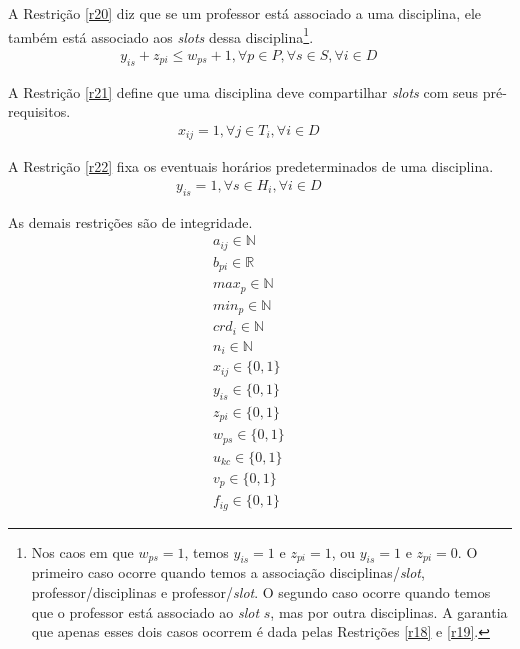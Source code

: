 A Restrição \ref{r20} diz que se um professor está associado a uma disciplina, ele também está associado aos \textit{slots} dessa disciplina\footnote{Nos caos em que $w_{ps} = 1$, temos $y_{is} = 1$ e $z_{pi} = 1$, ou $y_{is} = 1$ e $z_{pi} = 0$. O primeiro caso ocorre quando temos a associação disciplinas/\textit{slot}, professor/disciplinas e professor/\textit{slot}. O segundo caso ocorre quando temos que o professor está associado ao \textit{slot} $s$, mas por outra disciplinas.
A garantia que apenas esses dois casos ocorrem é dada pelas Restrições \ref{r18} e \ref{r19}.}. 
\begin{eqnarray}
\label{r20}
y_{is} + z_{pi} \le w_{ps} + 1, \forall{p}\in{P}, \forall{s}\in{S}, \forall{i}\in{D} &&
\end{eqnarray}

A Restrição \ref{r21} define que uma disciplina deve compartilhar \textit{slots} com seus pré-requisitos.
\begin{eqnarray}
\label{r21}
x_{ij} = 1, \forall{j\in{T_i}},\forall{i \in{D}} &&
\end{eqnarray}

A Restrição \ref{r22} fixa os eventuais horários predeterminados de uma disciplina.
\begin{eqnarray}
\label{r22}
y_{is} = 1, \forall{s \in{H_i}}, \forall{i \in{D}} &&
\end{eqnarray}

As demais restrições são de integridade.
\begin{eqnarray}
\label{r25}
a_{ij}\in{\mathbb{N}} &&\\
\label{r26}
b_{pi} \in{\mathbb{R}} &&\\
\label{r27}
max_{p} \in{\mathbb{N}} &&\\
\label{r28}
min_{p} \in{\mathbb{N}} &&\\
\label{r29}
crd_{i} \in{\mathbb{N}} &&\\
\label{r30}
n_{i} \in{\mathbb{N}} &&\\
\label{r31}
x_{ij}\in{\{0,1\}} &&\\
\label{r32}
y_{is}\in{\{0,1\}} &&\\
\label{r33}
z_{pi}\in{\{0,1\}} &&\\
\label{r34}
w_{ps}\in{\{0,1\}} && \\
\label{r35}
u_{kc}\in{\{0,1\}} && \\
\label{r36}
v_{p}\in{\{0,1\}} && \\
\label{r37}
f_{ig}\in{\{0,1\}} &&
\end{eqnarray}